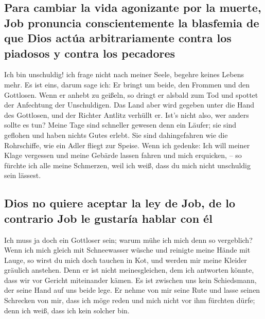 \hypertarget{para-cambiar-la-vida-agonizante-por-la-muerte-job-pronuncia-conscientemente-la-blasfemia-de-que-dios-actuxfaa-arbitrariamente-contra-los-piadosos-y-contra-los-pecadores}{%
\subsection{Para cambiar la vida agonizante por la muerte, Job pronuncia
conscientemente la blasfemia de que Dios actúa arbitrariamente contra
los piadosos y contra los
pecadores}\label{para-cambiar-la-vida-agonizante-por-la-muerte-job-pronuncia-conscientemente-la-blasfemia-de-que-dios-actuxfaa-arbitrariamente-contra-los-piadosos-y-contra-los-pecadores}}

 Ich bin unschuldig! ich frage nicht nach meiner Seele,
begehre keines Lebens mehr.  Es ist eins, darum sage ich:
Er bringt um beide, den Frommen und den Gottlosen.  Wenn
er anhebt zu geißeln, so dringt er alsbald zum Tod und spottet der
Anfechtung der Unschuldigen.  Das Land aber wird gegeben
unter die Hand des Gottlosen, und der Richter Antlitz verhüllt er. Ist's
nicht also, wer anders sollte es tun?  Meine Tage sind
schneller gewesen denn ein Läufer; sie sind geflohen und haben nichts
Gutes erlebt.  Sie sind dahingefahren wie die
Rohrschiffe, wie ein Adler fliegt zur Speise.  Wenn ich
gedenke: Ich will meiner Klage vergessen und meine Gebärde lassen fahren
und mich erquicken, --  so fürchte ich alle meine
Schmerzen, weil ich weiß, dass du mich nicht unschuldig sein lässest.

\hypertarget{dios-no-quiere-aceptar-la-ley-de-job-de-lo-contrario-job-le-gustaruxeda-hablar-con-uxe9l}{%
\subsection{Dios no quiere aceptar la ley de Job, de lo contrario Job le
gustaría hablar con
él}\label{dios-no-quiere-aceptar-la-ley-de-job-de-lo-contrario-job-le-gustaruxeda-hablar-con-uxe9l}}

 Ich muss ja doch ein Gottloser sein; warum mühe ich mich
denn so vergeblich?  Wenn ich mich gleich mit
Schneewasser wüsche und reinigte meine Hände mit Lauge, 
so wirst du mich doch tauchen in Kot, und werden mir meine Kleider
gräulich anstehen.  Denn er ist nicht meinesgleichen, dem
ich antworten könnte, dass wir vor Gericht miteinander kämen.
 Es ist zwischen uns kein Schiedsmann, der seine Hand auf
uns beide lege.  Er nehme von mir seine Rute und lasse
seinen Schrecken von mir,  dass ich möge reden und mich
nicht vor ihm fürchten dürfe; denn ich weiß, dass ich kein solcher bin.

